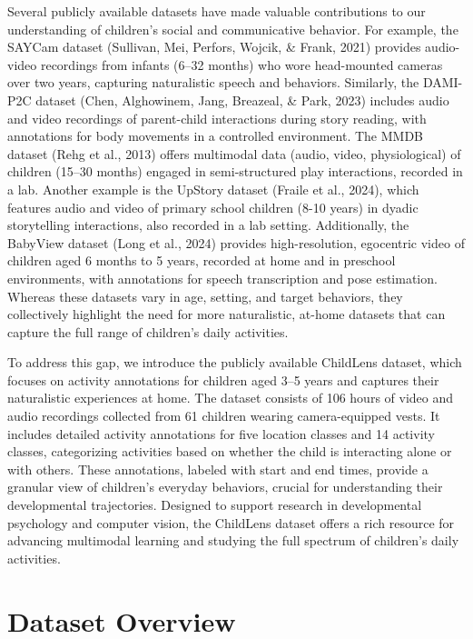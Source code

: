 \documentclass[
  man,floatsintext]{apa6}
\begin{document}
Several publicly available datasets have made valuable contributions to our understanding of children's social and communicative behavior. For example, the SAYCam dataset (Sullivan, Mei, Perfors, Wojcik, \& Frank, 2021) provides audio-video recordings from infants (6--32 months) who wore head-mounted cameras over two years, capturing naturalistic speech and behaviors. Similarly, the DAMI-P2C dataset (Chen, Alghowinem, Jang, Breazeal, \& Park, 2023) includes audio and video recordings of parent-child interactions during story reading, with annotations for body movements in a controlled environment. The MMDB dataset (Rehg et al., 2013) offers multimodal data (audio, video, physiological) of children (15--30 months) engaged in semi-structured play interactions, recorded in a lab. Another example is the UpStory dataset (Fraile et al., 2024), which features audio and video of primary school children (8-10 years) in dyadic storytelling interactions, also recorded in a lab setting. Additionally, the BabyView dataset (Long et al., 2024) provides high-resolution, egocentric video of children aged 6 months to 5 years, recorded at home and in preschool environments, with annotations for speech transcription and pose estimation. Whereas these datasets vary in age, setting, and target behaviors, they collectively highlight the need for more naturalistic, at-home datasets that can capture the full range of children's daily activities.

To address this gap, we introduce the publicly available ChildLens dataset, which focuses on activity annotations for children aged 3--5 years and captures their naturalistic experiences at home. The dataset consists of 106 hours of video and audio recordings collected from 61 children wearing camera-equipped vests. It includes detailed activity annotations for five location classes and 14 activity classes, categorizing activities based on whether the child is interacting alone or with others. These annotations, labeled with start and end times, provide a granular view of children's everyday behaviors, crucial for understanding their developmental trajectories. Designed to support research in developmental psychology and computer vision, the ChildLens dataset offers a rich resource for advancing multimodal learning and studying the full spectrum of children's daily activities.

\section{Dataset Overview}\label{dataset-overview}
\end{document}
